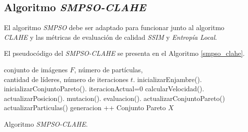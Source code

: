 

\subsection{Algoritmo \textit{SMPSO-CLAHE}}

El algoritmo \textit{SMPSO} debe ser adaptado para funcionar junto al algoritmo \textit{CLAHE} y las métricas de evaluación de calidad \textit{SSIM} y \textit{Entropía Local}.




El pseudocódigo del \textit{SMPSO-CLAHE} se presenta en el Algoritmo \ref{smpso_clahe}.

\begin{algorithm}[hbpt]
    \begin{algorithmic}[1]
    \REQUIRE conjunto de imágenes $F$, número de partículas, \\
    cantidad de líderes, número de iteraciones $t$. 
    \STATE inicializarEnjambre().
    \STATE inicializarConjuntoPareto().
    \STATE iteracionActual=0
        \STATE calcularVelocidad().
        \STATE actualizarPosicion().
        \STATE mutacion().
        \STATE evaluacion().
        \STATE actualizarConjuntoPareto()
        \STATE actualizarParticulas()
        \STATE generacion ++
    \ENDWHILE
    \RETURN Conjunto Pareto $X$
    \end{algorithmic}
    \caption{Algoritmo \textit{SMPSO-CLAHE}.}
    \label{smpso_clahe}
\end{algorithm} %

